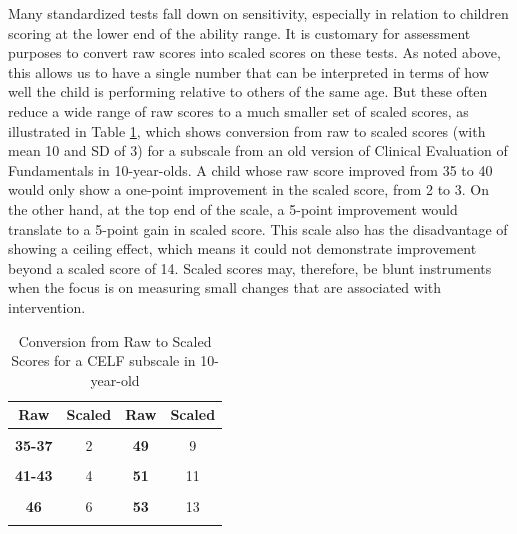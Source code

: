 \documentclass{krantz}
\begin{document}
Many standardized tests fall down on sensitivity, especially in relation to children scoring at the lower end of the ability range. It is customary for assessment purposes to convert raw scores into scaled scores on these tests. As noted above, this allows us to have a single number that can be interpreted in terms of how well the child is performing relative to others of the same age. But these often reduce a wide range of raw scores to a much smaller set of scaled scores, as illustrated in Table \ref{tab:celfexample}, which shows conversion from raw to scaled scores (with mean 10 and SD of 3) for a subscale from an old version of Clinical Evaluation of Fundamentals in 10-year-olds. A child whose raw score improved from 35 to 40 would only show a one-point improvement in the scaled score, from 2 to 3. On the other hand, at the top end of the scale, a 5-point improvement would translate to a 5-point gain in scaled score. This scale also has the disadvantage of showing a ceiling effect, which means it could not demonstrate improvement beyond a scaled score of 14. Scaled scores may, therefore, be blunt instruments when the focus is on measuring small changes that are associated with intervention.

\begin{table}

\caption{\label{tab:celfexample}Conversion from Raw to Scaled Scores for a CELF subscale in 10-year-old}
\centering
\begin{tabular}[t]{>{}cc>{}cc}
\toprule
Raw & Scaled & Raw & Scaled\\
\midrule
\textbf{\cellcolor{gray!6}{0-34}} & \cellcolor{gray!6}{1} & \textbf{\cellcolor{gray!6}{48}} & \cellcolor{gray!6}{8}\\
\textbf{35-37} & 2 & \textbf{49} & 9\\
\textbf{\cellcolor{gray!6}{38-40}} & \cellcolor{gray!6}{3} & \textbf{\cellcolor{gray!6}{50}} & \cellcolor{gray!6}{10}\\
\textbf{41-43} & 4 & \textbf{51} & 11\\
\textbf{\cellcolor{gray!6}{44-45}} & \cellcolor{gray!6}{5} & \textbf{\cellcolor{gray!6}{52}} & \cellcolor{gray!6}{12}\\
\addlinespace
\textbf{46} & 6 & \textbf{53} & 13\\
\textbf{\cellcolor{gray!6}{47}} & \cellcolor{gray!6}{7} & \textbf{\cellcolor{gray!6}{54}} & \cellcolor{gray!6}{14}\\
\bottomrule
\end{tabular}
\end{table}
\end{document}
